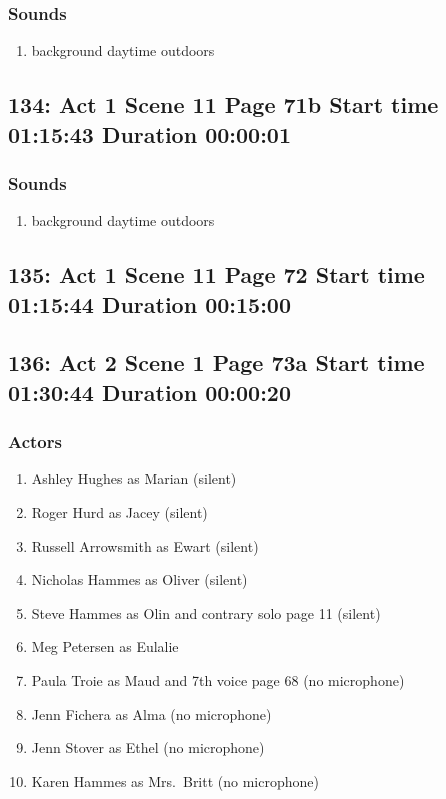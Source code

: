 \subsubsection{Sounds}
\begin{enumerate}
\item background daytime outdoors
\end{enumerate}
\subsection{134: Act 1 Scene 11 Page 71b Start time 01:15:43 Duration 00:00:01}
\subsubsection{Sounds}
\begin{enumerate}
\item background daytime outdoors
\end{enumerate}
\subsection{135: Act 1 Scene 11 Page 72 Start time 01:15:44 Duration 00:15:00}

\subsection{136: Act 2 Scene 1 Page 73a Start time 01:30:44 Duration 00:00:20}

\subsubsection{Actors}
\begin{enumerate}
\item Ashley Hughes as Marian (silent)
\item Roger Hurd as Jacey (silent)
\item Russell Arrowsmith as Ewart (silent)
\item Nicholas Hammes as Oliver (silent)
\item Steve Hammes as Olin and contrary solo page 11 (silent)
\item Meg Petersen as Eulalie
\item Paula Troie as Maud and 7th voice page 68 (no microphone)
\item Jenn Fichera as Alma (no microphone)
\item Jenn Stover as Ethel (no microphone)
\item Karen Hammes as Mrs.~Britt (no microphone)
\end{enumerate}

